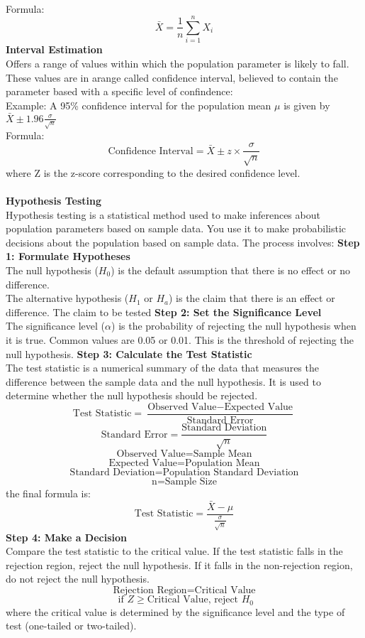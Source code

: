 \documentclass[a3paper,12pt]{extarticle} %
\begin{document}
    \\ Formula:
    \[
    \bar{X} = \frac{1}{n}\sum_{i=1}^{n}X_i
    \]
    \subitem \textbf{Interval Estimation}
    \\ Offers a range of values within which the population parameter is likely to fall. These values are in arange called confidence interval, believed to contain the parameter based with a specific level of confindence:
    \\ Example: A 95\% confidence interval for the population mean \(\mu\) is given by \(\bar{X} \pm 1.96\frac{\sigma}{\sqrt{n}}\)
    \\ Formula:
    \[
    \text{Confidence Interval} = \bar{X} \pm z \times \frac{\sigma}{\sqrt{n}}
    \]
    where Z is the z-score corresponding to the desired confidence level.
    \\ \\ \subitem \textbf{Hypothesis Testing}
    \\ Hypothesis testing is a statistical method used to make inferences about population parameters based on sample data. You use it to make probabilistic decisions about the population based on sample data. The process involves:
    \subitem \textbf{Step 1: Formulate Hypotheses}
    \\ The null hypothesis (\(H_0\)) is the default assumption that there is no effect or no difference. 
    \\ The alternative hypothesis (\(H_1\) or \(H_a\)) is the claim that there is an effect or difference. The claim to be tested
    \subitem \textbf{Step 2: Set the Significance Level}
    \\ The significance level (\(\alpha\)) is the probability of rejecting the null hypothesis when it is true. Common values are 0.05 or 0.01. This is the threshold of rejecting the null hypothesis.
    \subitem \textbf{Step 3: Calculate the Test Statistic}
    \\ The test statistic is a numerical summary of the data that measures the difference between the sample data and the null hypothesis. It is used to determine whether the null hypothesis should be rejected.
    \[
    \text{Test Statistic} = \frac{\text{Observed Value} - \text{Expected Value}}{\text{Standard Error}}
    \]
    \[
    \text{Standard Error} = \frac{\text{Standard Deviation}}{\sqrt{n}}
    \]
    \[
    \text{Observed Value} = \text{Sample Mean}
    \]
    \[
    \text{Expected Value} = \text{Population Mean}
    \]
    \[
    \text{Standard Deviation} = \text{Population Standard Deviation}
    \]
    \[
    \text{n} = \text{Sample Size}
    \]
    the final formula is:
    \[
    \text{Test Statistic} = \frac{\bar{X} - \mu}{\frac{\sigma}{\sqrt{n}}}
    \]
    \subitem \textbf{Step 4: Make a Decision}
    \\ Compare the test statistic to the critical value. If the test statistic falls in the rejection region, reject the null hypothesis. If it falls in the non-rejection region, do not reject the null hypothesis.
    \[
    \text{Rejection Region} = \text{Critical Value}
    \]
    \[
    \text{ if } Z \geq \text{Critical Value} \text{, reject } H_0
    \]
    where the critical value is determined by the significance level and the type of test (one-tailed or two-tailed).
    
\end{document}
